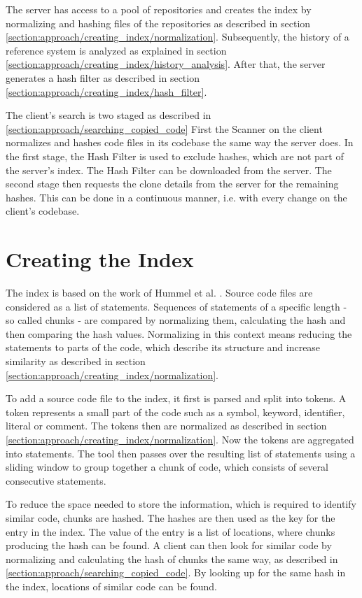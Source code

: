 The server has access to a pool of repositories and creates the index by normalizing and hashing files of the repositories as described in section \ref{section:approach/creating_index/normalization}.
Subsequently, the history of a reference system is analyzed as explained in section \ref{section:approach/creating_index/history_analysis}.
After that, the server generates a hash filter as described in section \ref{section:approach/creating_index/hash_filter}.

The client's search is two staged as described in \autoref{section:approach/searching_copied_code}
First the Scanner on the client normalizes and hashes code files in its codebase the same way the server does.
In the first stage, the Hash Filter is used to exclude hashes, which are not part of the server's index.
The Hash Filter can be downloaded from the server.
The second stage then requests the clone details from the server for the remaining hashes.
This can be done in a continuous manner, i.e. with every change on the client's codebase.

\section{Creating the Index}\label{section:approach/creating_index}
The index is based on the work of Hummel et al. \cite{hummel2010index}.
Source code files are considered as a list of statements.
Sequences of statements of a specific length - so called chunks - are compared by normalizing them, calculating the hash and then comparing the hash values.
Normalizing in this context means reducing the statements to parts of the code, which describe its structure and increase similarity as described in section \ref{section:approach/creating_index/normalization}.

To add a source code file to the index, it first is parsed and split into tokens.
A token represents a small part of the code such as a symbol, keyword, identifier, literal or comment.
The tokens then are normalized as described in section \ref{section:approach/creating_index/normalization}.
Now the tokens are aggregated into statements.
The tool then passes over the resulting list of statements using a sliding window to group together a chunk of code, which consists of several consecutive statements. 

To reduce the space needed to store the information, which is required to identify similar code, chunks are hashed.
The hashes are then used as the key for the entry in the index.
The value of the entry is a list of locations, where chunks producing the hash can be found.
A client can then look for similar code by normalizing and calculating the hash of chunks the same way, as described in \autoref{section:approach/searching_copied_code}.
By looking up for the same hash in the index, locations of similar code can be found.

